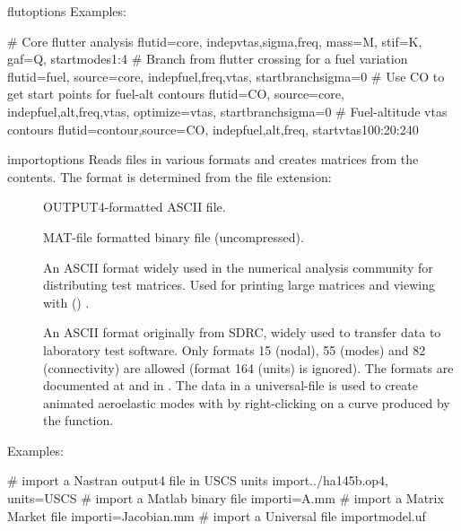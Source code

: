 \begin{cmdref}{flut}{options}
Examples:
\begin{example}
# Core flutter analysis
flut{id=core, indep{vtas,sigma,freq},
   mass=M, stif=K, gaf=Q, start{modes{1:4}}}
# Branch from flutter crossing for a fuel variation
flut{id=fuel, source=core, indep{fuel,freq,vtas},
   start{branch{sigma=0}}}
# Use CO to get start points for fuel-alt contours
flut{id=CO, source=core, indep{fuel,alt,freq,vtas},
     optimize=vtas, start{branch{sigma=0}}}
# Fuel-altitude vtas contours
flut{id=contour,source=CO, indep{fuel,alt,freq},
     start{vtas{100:20:240}}}
\end{example}

\end{cmdref}


\begin{cmdref}{import}{options}
Reads files in various formats and creates matrices from the contents.
The format is determined from the file extension:
\begin{description}
	\item[] \Nastran OUTPUT4-formatted ASCII file.
	\item[] \Octlab MAT-file formatted binary file (uncompressed).
	\item[]
		An ASCII format widely used in the numerical analysis community
		for distributing test matrices. Used for printing
		large matrices and viewing with 
		() \cite{matrixmarket}.
	\item[]
		An ASCII format originally from SDRC, widely used to
		transfer data to laboratory test software.
		Only formats 15 (nodal), 55 (modes) and 82 (connectivity)
		are allowed (format 164 (units) is ignored). The formats are
		documented at \cite{UniversalFile} and in
		.
		The data in a universal-file is used to create animated
		aeroelastic modes with  by right-clicking on a
		curve produced by the  function.
\end{description}

\begin{subopts}
\end{subopts}

Examples:
\begin{example}
# import a Nastran output4 file in USCS units
import{../ha145b.op4, units=USCS}
# import a Matlab binary file
import{i=A.mm}
# import a Matrix Market file
import{i=Jacobian.mm}
# import a Universal file
import{model.uf}
\end{example}

\end{cmdref}

